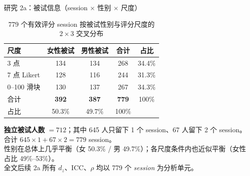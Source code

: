 \documentclass[aspectratio=169,professionalfonts]{beamer}
\begin{document}
\begin{frame}{研究 2a：被试信息（session $\times$ 性别 $\times$ 尺度）}
  \footnotesize
  \setlength{\tabcolsep}{6pt}
  \begin{table}
    \centering
    \caption{\small 779 个有效评分 session 按被试性别与评分尺度的 $2 \times 3$ 交叉分布}
    \begin{tabular}{lccc|c}
      \toprule
      尺度 & 女性被试 & 男性被试 & 合计 & 占比 \\
      \midrule
      3 点        & 134 & 134 & 268 & 34.4\% \\
      7 点 Likert & 128 & 116 & 244 & 31.3\% \\
      0--100 滑块 & 130 & 137 & 267 & 34.3\% \\
      \midrule
      合计        & \textbf{392} & \textbf{387} & \textbf{779} & 100\% \\
      占比        & 50.3\%       & 49.7\%       & 100\%        &        \\
      \bottomrule
    \end{tabular}
  \end{table}

  \vspace{0.3em}
  \small \textbf{独立被试人数} $=712$；其中 645 人只留下 1 个 session、67 人留下 2 个 session。合计 $645\times 1 + 67\times 2 = 779$ session。\\
  性别在总体上几乎平衡（女 50.3\% / 男 49.7\%）；各尺度条件内也近似平衡（女性占比 49\%--53\%）。\\
  全文后续 2a 所有 $d_z$、ICC、$\rho$ 均以 779 个 \emph{session} 为分析单元。
\end{frame}
\end{document}

